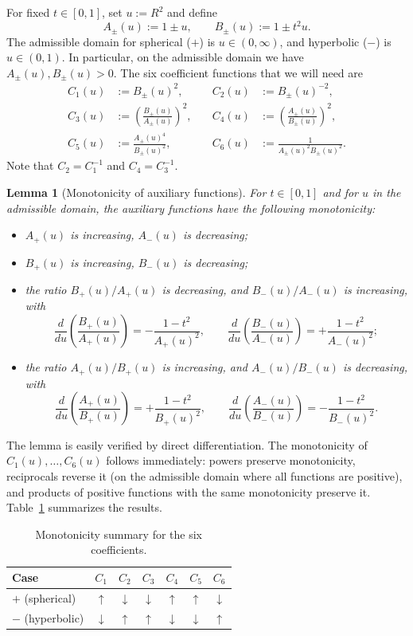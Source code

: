 \documentclass[11pt]{amsart}
\newtheorem{lemma}[theorem]{Lemma}
\theoremstyle{definition}
\numberwithin{equation}{section}
\begin{document}
For fixed $t \in [0,1]$, set $u := R^2$ and define
\[
A_\pm(u) := 1 \pm u, \qquad B_\pm(u) := 1 \pm t^2 u.
\]
The admissible domain for spherical ($+$) is $u \in (0,\infty)$, and hyperbolic ($-$) is $u \in (0,1)$. In particular, on the admissible domain we have $A_\pm(u),B_\pm(u)>0$.
The six coefficient functions that we will need are
\begin{align*}
C_1(u) &:= B_\pm(u)^2, 
&\quad C_2(u) &:= B_\pm(u)^{-2},\\
C_3(u) &:= \left(\frac{B_\pm(u)}{A_\pm(u)}\right)^2, 
&\quad C_4(u) &:= \left(\frac{A_\pm(u)}{B_\pm(u)}\right)^2,\\
C_5(u) &:= \frac{A_\pm(u)^4}{B_\pm(u)^2},
&\quad C_6(u) &:= \frac{1}{A_\pm(u)^2B_\pm(u)^2}.
\end{align*}
Note that $C_2 = C_1^{-1}$ and $C_4 = C_3^{-1}$.

\begin{lemma}[Monotonicity of auxiliary functions]
For $t \in [0,1]$ and for $u$ in the admissible domain, the auxiliary functions have the following monotonicity:
\begin{itemize}
    \item $A_+(u)$ is increasing, $A_-(u)$ is decreasing;
    \item $B_+(u)$ is increasing, $B_-(u)$ is decreasing;
    \item the ratio $B_+(u)/A_+(u)$ is decreasing, and $B_-(u)/A_-(u)$ is increasing, with
    \[
    \frac{d}{du}\left(\frac{B_+(u)}{A_+(u)}\right) = -\frac{1-t^2}{A_+(u)^2},
    \qquad
    \frac{d}{du}\left(\frac{B_-(u)}{A_-(u)}\right) = +\frac{1-t^2}{A_-(u)^2};
    \]
    \item the ratio $A_+(u)/B_+(u)$ is increasing, and $A_-(u)/B_-(u)$ is decreasing, with
    \[
    \frac{d}{du}\left(\frac{A_+(u)}{B_+(u)}\right) = +\frac{1-t^2}{B_+(u)^2},
    \qquad
    \frac{d}{du}\left(\frac{A_-(u)}{B_-(u)}\right) = -\frac{1-t^2}{B_-(u)^2}.
    \]
\end{itemize}
\end{lemma}

The lemma is easily verified by direct differentiation. The monotonicity of $C_1(u),\ldots,C_6(u)$ follows immediately: powers preserve monotonicity, reciprocals reverse it (on the admissible domain where all functions are positive), and products of positive functions with the same monotonicity preserve it. Table~\ref{tab:coeff-monotonicity} summarizes the results.

\begin{table}[ht]
\centering
\begin{tabular}{@{}lcccccc@{}}
\toprule
Case & $C_1$ & $C_2$ & $C_3$ & $C_4$ & $C_5$ & $C_6$ \\
\midrule
$+$ (spherical) & $\uparrow$ & $\downarrow$ & $\downarrow$ & $\uparrow$ & $\uparrow$ & $\downarrow$ \\
$-$ (hyperbolic) & $\downarrow$ & $\uparrow$ & $\uparrow$ & $\downarrow$ & $\downarrow$ & $\uparrow$ \\
\bottomrule
\end{tabular}
\caption{Monotonicity summary for the six coefficients.}
\label{tab:coeff-monotonicity}
\end{table}
\end{document}
